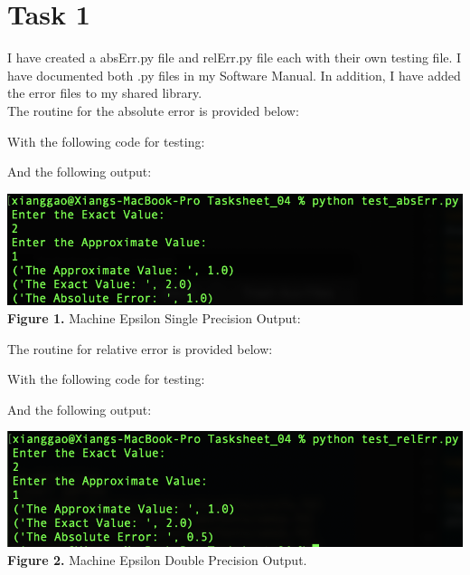\documentclass{article}
\begin{document}
\section*{Task 1}
I have created a absErr.py file and relErr.py file each with their own testing file. I have documented both .py files in my Software Manual. In addition, I have added the error files to my shared library.\\
The routine for the absolute error is provided below:

With the following code for testing:

And the following output:
\begin{center}
\includegraphics[width=\textwidth]{Screenshots/test_absErr.png}
{\bf Figure 1.} Machine Epsilon Single Precision Output:
\end{center}
The routine for relative error is provided below:

With the following code for testing:

And the following output:
\begin{center}
\includegraphics[width=\textwidth]{Screenshots/test_relErr.png}\\
{\bf Figure 2.} Machine Epsilon Double Precision Output.
\end{center}

\vspace{5pt}
\end{document}
